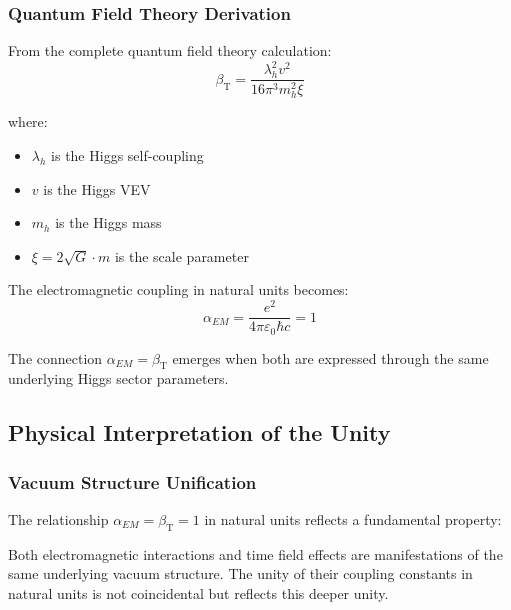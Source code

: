 \documentclass[12pt,a4paper]{article}
\newcommand{\betaT}{\beta_{\text{T}}}
\begin{document}
	\subsubsection{Quantum Field Theory Derivation}
	\label{subsubsec:qft_derivation}
	
	From the complete quantum field theory calculation:
	\begin{equation}
		\betaT = \frac{\lambda_h^2 v^2}{16\pi^3 m_h^2 \xi}
	\end{equation}
	
	where:
	\begin{itemize}
		\item $\lambda_h$ is the Higgs self-coupling
		\item $v$ is the Higgs VEV
		\item $m_h$ is the Higgs mass
		\item $\xi = 2\sqrt{G} \cdot m$ is the scale parameter
	\end{itemize}
	
	The electromagnetic coupling in natural units becomes:
	\begin{equation}
		\alpha_{EM} = \frac{e^2}{4\pi\varepsilon_0\hbar c} = 1
	\end{equation}
	
	The connection $\alpha_{EM} = \betaT$ emerges when both are expressed through the same underlying Higgs sector parameters.
	
	\subsection{Physical Interpretation of the Unity}
	\label{subsec:physical_interpretation}
	
	\subsubsection{Vacuum Structure Unification}
	\label{subsubsec:vacuum_unification}
	
	The relationship $\alpha_{EM} = \betaT = 1$ in natural units reflects a fundamental property:
	
	\begin{tcolorbox}[colback=green!5!white,colframe=green!75!black,title=Vacuum Structure Unity]
		Both electromagnetic interactions and time field effects are manifestations of the same underlying vacuum structure. The unity of their coupling constants in natural units is not coincidental but reflects this deeper unity.
	\end{tcolorbox}
	
\end{document}
